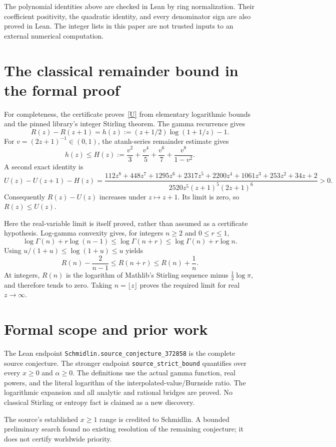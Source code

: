 \documentclass[11pt]{article}
\begin{document}
The polynomial identities above are checked in Lean by ring normalization.
Their coefficient positivity, the quadratic identity, and every denominator
sign are also proved in Lean. The integer lists in this paper are not trusted
inputs to an external numerical computation.

\newpage
\section{The classical remainder bound in the formal proof}
For completeness, the certificate proves~\eqref{U} from elementary logarithmic
bounds and the pinned library's integer Stirling theorem. The gamma recurrence gives
\[
 R(z)-R(z+1)=h(z):=(z+1/2)\log(1+1/z)-1.
\]
For $v=(2z+1)^{-1}\in(0,1)$, the atanh-series remainder estimate gives
\[
 h(z)\le H(z):=\frac{v^2}{3}+\frac{v^4}{5}+\frac{v^6}{7}
                    +\frac{v^8}{1-v^2}.
\]
A second exact identity is
\[
 U(z)-U(z+1)-H(z)=
 \frac{112z^8+448z^7+1295z^6+2317z^5+2200z^4+1061z^3+253z^2+34z+2}
 {2520z^5(z+1)^5(2z+1)^6}>0.
\]
Consequently $R(z)-U(z)$ increases under $z\mapsto z+1$. Its limit is zero,
so $R(z)\le U(z)$.

Here the real-variable limit is itself proved, rather than assumed as a
certificate hypothesis. Log-gamma convexity gives, for integers $n\ge2$ and
$0\le r\le1$,
\[
 \log\Gamma(n)+r\log(n-1)\le\log\Gamma(n+r)
                       \le\log\Gamma(n)+r\log n.
\]
Using $u/(1+u)\le\log(1+u)\le u$ yields
\[
 R(n)-\frac2{n-1}\le R(n+r)\le R(n)+\frac1n.
\]
At integers, $R(n)$ is the logarithm of Mathlib's Stirling sequence minus
$\tfrac12\log\pi$, and therefore tends to zero. Taking $n=\lfloor z\rfloor$
proves the required limit for real $z\to\infty$.

\section{Formal scope and prior work}
The Lean endpoint \texttt{Schmidlin.source\_conjecture\_372858} is the complete
source conjecture. The stronger endpoint \texttt{source\_strict\_bound} quantifies
over every $x\ge0$ and $\alpha\ge0$. The definitions use the actual gamma function,
real powers, and the literal logarithm of the interpolated-value/Burnside ratio.
The logarithmic expansion and all analytic and rational bridges are proved.
No classical Stirling or entropy fact is claimed as a new discovery.

The source's established $x\ge1$ range is credited to Schmidlin. A bounded
preliminary search found no existing resolution of the remaining conjecture;
it does not certify worldwide priority.
\end{document}
